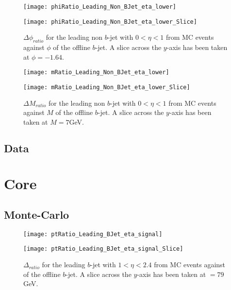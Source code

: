 		\begin{figure}[h]
			\centering

			\begin{minipage}[h]{0.33\linewidth}
				\texttt{[image: phiRatio\_Leading\_Non\_BJet\_eta\_lower]}
			\end{minipage}
			\quad
			\begin{minipage}[h]{0.33\linewidth}
				\texttt{[image: phiRatio\_Leading\_Non\_BJet\_eta\_lower\_Slice]}
			\end{minipage}
			\caption{$\Delta \phi_{ratio}$ for the leading \pt non $b$-jet with $0 < \eta < 1$ from MC events against $\phi$ of the offline $b$-jet. A slice across the $y$-axis has been taken at $\phi=-1.64$. }
			\label{fig:MC:leadingnonbphicentral}
		\end{figure}

		\begin{figure}[h]
			\centering

			\begin{minipage}[h]{0.33\linewidth}
				\texttt{[image: mRatio\_Leading\_Non\_BJet\_eta\_lower]}
			\end{minipage}
			\quad
			\begin{minipage}[h]{0.33\linewidth}
				\texttt{[image: mRatio\_Leading\_Non\_BJet\_eta\_lower\_Slice]}
			\end{minipage}
			\caption{$\Delta M_{ratio}$ for the leading \pt non $b$-jet with $0 < \eta < 1$ from MC events against $M$ of the offline $b$-jet. A slice across the $y$-axis has been taken at $M=7$GeV. }
			\label{fig:MC:leadingnonbmcentral}
		\end{figure}

		\subsection{Data}

\newpage
\section{Core}

	\subsection{Monte-Carlo}

	\begin{figure}[h]
		\centering
		\begin{minipage}[h]{0.33\linewidth}
			\texttt{[image: ptRatio\_Leading\_BJet\_eta\_signal]}

		\end{minipage}
		\quad
		\begin{minipage}[h]{0.33\linewidth}
			\texttt{[image: ptRatio\_Leading\_BJet\_eta\_signal\_Slice]}
		\end{minipage}
		\caption{$\Delta $\pt$_{ratio}$ for the leading \pt $b$-jet with $1 < \eta < 2.4$ from MC events against \pt of the offline $b$-jet. A slice across the $y$-axis has been taken at \pt$=79$GeV. }
		\label{fig:MC:leadingbptcore}
	\end{figure}

